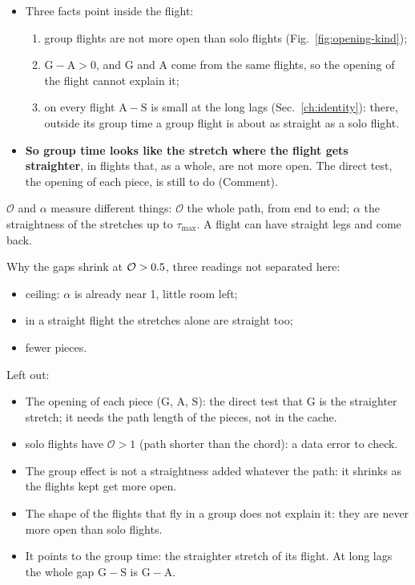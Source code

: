 \documentclass[10pt,a4paper]{article}
\newcommand{\G}{\mathrm{G}}
\newcommand{\A}{\mathrm{A}}
\newcommand{\Sl}{\mathrm{S}}
\newcommand{\Home}{\item[\textcolor{answer}{\textbf{Take home.}}]\color{black}}
\newcommand{\Com}{\item[\textcolor{black}{\textbf{Comment.}}]\color{black}}
\newenvironment{step}{\begin{description}[leftmargin=0pt, itemsep=7pt, topsep=8pt]}{\end{description}}
\begin{document}
\begin{step}
\begin{itemize}
  \item Three facts point inside the flight:
    \begin{enumerate}
    \item group flights are not more open than solo flights (Fig.~\ref{fig:opening-kind});
    \item $\G-\A>0$, and $\G$ and $\A$ come from the same flights, so the opening of the flight cannot
      explain it;
    \item on every flight $\A-\Sl$ is small at the long lags (Sec.~\ref{ch:identity}): there, outside its group
      time a group flight is about as straight as a solo flight.
    \end{enumerate}
  \item \textbf{So group time looks like the stretch where the flight gets straighter}, in flights that, as a
    whole, are not more open. The direct test, the opening of each piece, is still to do (Comment).
  \end{itemize}
\Com $\mathcal O$ and $\alpha$ measure different things: $\mathcal O$ the whole path, from end to end; $\alpha$
  the straightness of the stretches up to $\tau_\mathrm{max}$. A flight can have straight legs and come back.
\Com Why the gaps shrink at $\mathcal O>0.5$, three readings not separated here:
  \begin{itemize}
  \item ceiling: $\alpha$ is already near 1, little room left;
  \item in a straight flight the stretches alone are straight too;
  \item fewer pieces.
  \end{itemize}
\Com Left out:
  \begin{itemize}
  \item The opening of each piece ($\G$, $\A$, $\Sl$): the direct test that $\G$ is the straighter stretch;
    it needs the path length of the pieces, not in the cache.
  \item \OpeningAboveOne{} solo flights have $\mathcal O>1$ (path shorter than the chord): a data error to check.
  \end{itemize}
\Home\mbox{}
  \begin{itemize}
  \item The group effect is not a straightness added whatever the path: it shrinks as the flights kept get
    more open.
  \item The shape of the flights that fly in a group does not explain it: they are never more open than solo
    flights.
  \item It points to the group time: the straighter stretch of its flight. At long lags the whole
    gap $\G-\Sl$ is $\G-\A$.
  \end{itemize}
\end{step}
\end{document}
